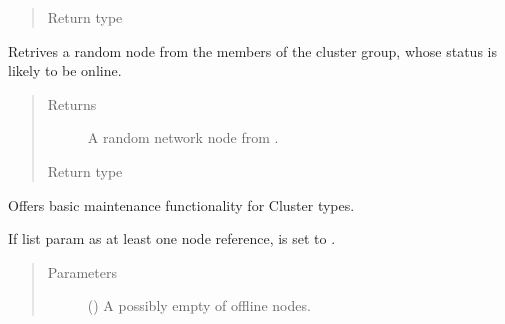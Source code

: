 \documentclass[letterpaper,10pt,english]{sphinxmanual}
\begin{document}
\begin{fulllineitems}
\begin{fulllineitems}
\begin{quote}
\begin{description}
\item[{Return type}] \leavevmode
{}

\end{description}\end{quote}

\end{fulllineitems}


\begin{fulllineitems}
\label{\detokenize{app.domain:app.domain.cluster_groups.Cluster.get_node}}
Retrives a random node from the members of the cluster group,
whose status is likely to be online.
\begin{quote}\begin{description}
\item[{Returns}] \leavevmode
A random network node from {\hyperref[\detokenize{app.domain:app.domain.cluster_groups.Cluster.members}]{}}.

\item[{Return type}] \leavevmode
{\hyperref[\detokenize{app:app.type_hints.NodeType}]{}}

\end{description}\end{quote}

\end{fulllineitems}


\begin{fulllineitems}
\label{\detokenize{app.domain:app.domain.cluster_groups.Cluster.maintain}}
Offers basic maintenance functionality for Cluster types.

If  list param as at least one node reference,
{\hyperref[\detokenize{app.domain:app.domain.cluster_groups.Cluster._membership_changed}]{}} is set to .
\begin{quote}\begin{description}
\item[{Parameters}] \leavevmode
{} (\sphinxstyleliteralemphasis{\sphinxupquote{{[}}}\sphinxstyleliteralemphasis{\sphinxupquote{{]}}}) \textendash{} A possibly empty of offline nodes.


\end{description}
\end{quote}
\end{fulllineitems}
\end{fulllineitems}
\end{document}
